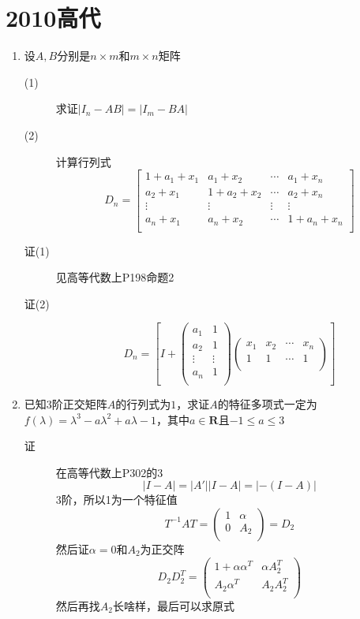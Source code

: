 \section{2010高代}
\begin{enumerate}
\item 设$A,B$分别是$n\times m$和$m\times n$矩阵
\begin{description}
\item[(1)] 求证$|I_n-AB|=|I_m-BA|$
\item[(2)] 计算行列式
\[
D_n = \left[
\begin{array}{cccc}
1+a_1+x_1 & a_1+x_2 & \cdots & a_1+x_n\\
a_2+x_1 & 1+a_2+x_2 & \cdots & a_2+x_n \\
\vdots & \vdots & \vdots & \vdots \\
a_n+x_1 & a_n+x_2 & \cdots & 1+a_n+x_n \\
\end{array}\right]
\]
\item[证(1)] 见高等代数上P198命题2
\item[证(2)]
\[
D_n = \left[I+\left(
\begin{array}{cc}
a_1 & 1\\
a_2 & 1\\
\vdots & \vdots\\
a_n & 1\\
\end{array}\right)\left(
\begin{array}{cccc}
x_1 & x_2 & \cdots & x_n \\
1 & 1 & \cdots & 1 \\
\end{array}\right)
\right]
\]
\end{description}

\item 已知3阶正交矩阵$A$的行列式为$1$，求证$A$的特征多项式一定为$f(\lambda)=\lambda^3-a\lambda^2+a\lambda-1$，其中$a\in \mathbf{R}$且$-1 \leq a\leq 3$
\begin{description}
\item[证] 在高等代数上P302的3
\[
|I-A|=|A'||I-A|=|-(I-A)|
\]
3阶，所以1为一个特征值
\[
T^{-1}AT=\left(
\begin{array}{cc}
1 & \alpha\\
0 & A_2\\
\end{array}
\right) = D_2
\]
然后证$\alpha=0$和$A_2$为正交阵
\[
D_2D_2^T=\left(
\begin{array}{cc}
1+\alpha\alpha^T & \alpha A_2^T\\
A_2\alpha^T & A_2A_2^T\\
\end{array}
\right)
\]
然后再找$A_2$长啥样，最后可以求原式
\end{description}



\end{enumerate}
